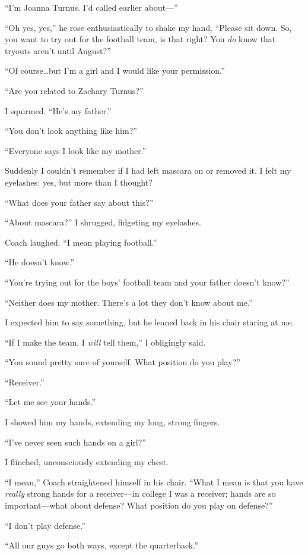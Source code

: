 ``I'm Joanna Turnus. I'd called earlier about---''

``Oh yes, yes,'' he rose enthusiastically to shake my hand. ``Please sit
down. So, you want to try out for the football team, is that right? You
\emph{do} know that tryouts aren't until August?''

``Of course\ldots but I'm a girl and I would like your permission.''

``Are you related to Zachary Turnus?''

I squirmed. ``He's my father.''

``You don't look anything like him?''

``Everyone says I look like my mother.''

Suddenly I couldn't remember if I had left mascara on or removed it. I
felt my eyelashes: yes, but more than I thought?

``What does your father say about this?''

``About mascara?'' I shrugged, fidgeting my eyelashes.

Coach laughed. ``I mean playing football.''

``He doesn't know.''

``You're trying out for the boys' football team and your father doesn't
know?''

``Neither does my mother. There's a lot they don't know about me.''

I expected him to say something, but he leaned back in his chair staring
at me.

``If I make the team, I \emph{will} tell them,'' I obligingly said.

``You sound pretty sure of yourself. What position do you play?''

``Receiver.''

``Let me see your hands.''

I showed him my hands, extending my long, strong fingers.

``I've never seen such hands on a girl?''

I flinched, unconsciously extending my chest.

``I mean,'' Coach straightened himself in his chair. ``What I mean is
that you have \emph{really} strong hands for a receiver---in college I
was a receiver; hands are so important---what about defense? What
position do you play on defense?''

``I don't play defense.''

``All our guys go both ways, except the quarterback.''

